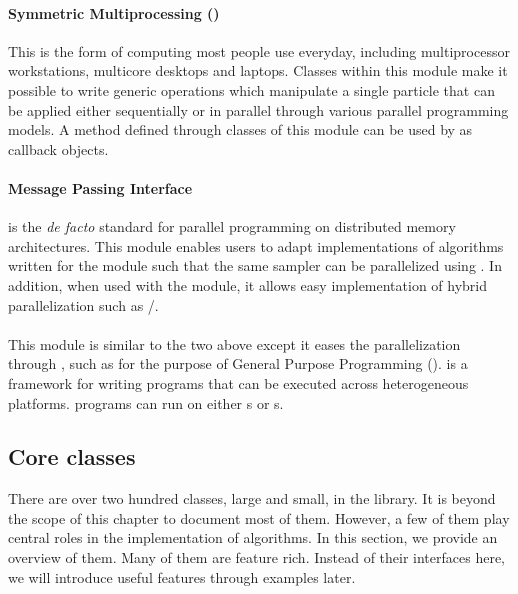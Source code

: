 \paragraph{Symmetric Multiprocessing (\smp)}

This is the form of computing most people use everyday, including multiprocessor workstations, multicore desktops and laptops. Classes within this module make it possible to write generic operations which manipulate a single particle that can be applied either sequentially or in parallel through various parallel programming models. A method defined through classes of this module can be used by  as callback objects.

\paragraph{Message Passing Interface}

\mpi is the \emph{de facto} standard for parallel programming on distributed memory architectures. This module enables users to adapt implementations of algorithms written for the \smp module such that the same sampler can be parallelized using \mpi. In addition, when used with the \smp module, it allows easy implementation of hybrid parallelization such as \mpi/\openmp.

\paragraph{\opencl}

This module is similar to the two above except it eases the parallelization through \opencl, such as for the purpose of General Purpose \gpu Programming (\gpgpu). \opencl is a framework for writing programs that can be executed across heterogeneous platforms. \opencl programs can run on either \cpu{}s or \gpu{}s.

\subsection{Core classes}
\label{sub:Core classes}

There are over two hundred classes, large and small, in the \vsmc library. It is beyond the scope of this chapter to document most of them. However, a few of them play central roles in the implementation of \smc algorithms. In this section, we provide an overview of them. Many of them are feature rich. Instead of  their interfaces here, we will introduce useful features through examples later.

